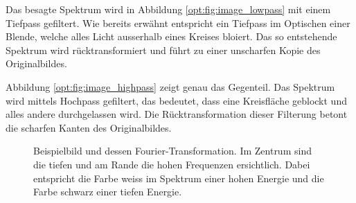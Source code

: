 Das besagte Spektrum wird in Abbildung \ref{opt:fig:image_lowpass} mit einem Tiefpass gefiltert.
Wie bereits erwähnt entspricht ein Tiefpass im Optischen einer Blende, welche alles Licht ausserhalb eines Kreises bloiert.
Das so entstehende Spektrum wird rücktransformiert und führt zu einer unscharfen Kopie des Originalbildes.

Abbildung \ref{opt:fig:image_highpass} zeigt genau das Gegenteil. 
Das Spektrum wird mittels Hochpass gefiltert, das bedeutet, dass eine Kreisfläche geblockt und alles andere durchgelassen wird.
Die Rücktransformation dieser Filterung betont die scharfen Kanten des Originalbildes. 

\begin{figure}
    \centering

    \caption{Beispielbild und dessen Fourier-Transformation.
    Im Zentrum sind die tiefen und am Rande die hohen Frequenzen ersichtlich.
    Dabei entspricht die Farbe weiss im Spektrum einer hohen Energie und die Farbe schwarz einer tiefen Energie.}
    \label{opt:fig:image_raw}
\end{figure}

